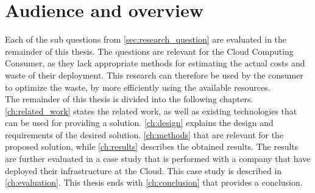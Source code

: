 \section{Audience and overview} \label{sec:audience}
Each of the sub questions from \autoref{sec:research_question} are evaluated in the remainder of this thesis. The questions are relevant for the Cloud Computing Consumer, as they lack appropriate methods for estimating the actual costs and waste of their deployment. This research can therefore be used by the consumer to optimize the waste, by  more efficiently using the available resources. \\

\noindent
The remainder of this thesis is divided into the following chapters. \autoref{ch:related_work} states the related work, as well as existing technologies that can be used for providing a solution. \autoref{ch:design} explains the design and requirements of the desired solution. \autoref{ch:methods} that are relevant for the proposed solution, while \autoref{ch:results} describes the obtained results. The results are further evaluated in a case study that is performed with a company that have deployed their infrastructure at the Cloud. This case study is described in \autoref{ch:evaluation}. This thesis ends with \autoref{ch:conclusion} that provides a conclusion.